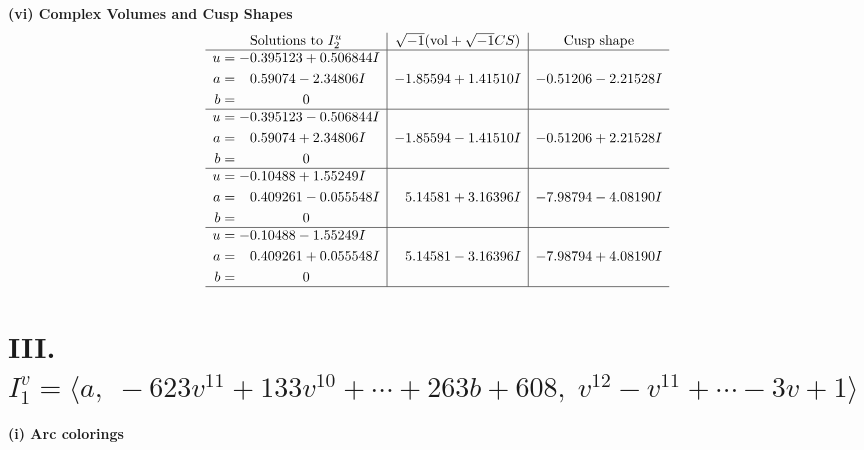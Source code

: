 \documentclass[1p]{elsarticle_modified}
\theoremstyle{definition}
\newcommand{\I}{\sqrt{-1}}
\begin{document}
\newpage\flushleft \textbf{(vi) Complex Volumes and Cusp Shapes}
$$\begin{array}{c|c|c}  
\text{Solutions to }I^u_{2}& \I (\text{vol} + \sqrt{-1}CS) & \text{Cusp shape}\\
 \hline 
\begin{aligned}
u &= -0.395123 + 0.506844 I \\
a &= \phantom{-}0.59074 - 2.34806 I \\
b &= \phantom{-0.000000 } 0\end{aligned}
 & -1.85594 + 1.41510 I & -0.51206 - 2.21528 I \\ \hline\begin{aligned}
u &= -0.395123 - 0.506844 I \\
a &= \phantom{-}0.59074 + 2.34806 I \\
b &= \phantom{-0.000000 } 0\end{aligned}
 & -1.85594 - 1.41510 I & -0.51206 + 2.21528 I \\ \hline\begin{aligned}
u &= -0.10488 + 1.55249 I \\
a &= \phantom{-}0.409261 - 0.055548 I \\
b &= \phantom{-0.000000 } 0\end{aligned}
 & \phantom{-}5.14581 + 3.16396 I & -7.98794 - 4.08190 I \\ \hline\begin{aligned}
u &= -0.10488 - 1.55249 I \\
a &= \phantom{-}0.409261 + 0.055548 I \\
b &= \phantom{-0.000000 } 0\end{aligned}
 & \phantom{-}5.14581 - 3.16396 I & -7.98794 + 4.08190 I\\
 \hline 
 \end{array}$$\newpage\newpage\renewcommand{\arraystretch}{1}
\centering \section*{III. $I^v_{1}= \langle a,\;-623 v^{11}+133 v^{10}+\cdots+263 b+608,\;v^{12}- v^{11}+\cdots-3 v+1 \rangle$}
\flushleft \textbf{(i) Arc colorings}\\
\end{document}
